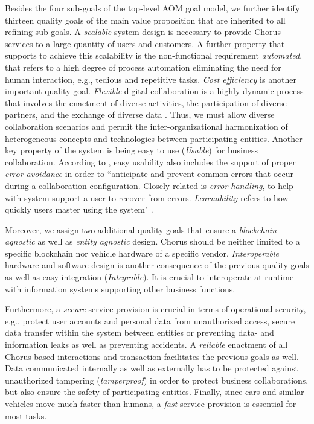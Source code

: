 \documentclass{llncs}
\begin{document}
{				Besides the four sub-goals of the top-level AOM goal model, we further identify thirteen quality goals of the main value proposition that are inherited to all refining sub-goals. A \textit{scalable} system design is necessary to provide Chorus services to a large quantity of users and customers. A further property that supports to achieve this scalability is the non-functional requirement \textit{automated}, that refers to a high degree of process automation eliminating the need for human interaction, e.g., tedious and repetitive tasks. \textit{Cost efficiency} is another important quality goal. \textit{Flexible} digital collaboration is a highly dynamic process that involves the enactment of diverse activities, the participation of diverse partners, and the exchange of diverse data \cite{norta2008exploring}. Thus, we must allow diverse collaboration scenarios and permit the inter-organizational harmonization of heterogeneous concepts and technologies between participating entities. Another key property of the system is being easy to use (\textit{Usable}) for business collaboration. According to \cite{norta2014reference}, easy usability also includes the support of proper \textit{error avoidance} in order to ``anticipate and prevent common errors that occur during a collaboration configuration. Closely related is \textit{error handling}, to help with system support a user to recover from errors. \textit{Learnability} refers to how quickly users master using the system" \cite{norta2014reference}. 
				
				Moreover, we assign two additional quality goals that ensure a \textit{blockchain agnostic} as well as \textit{entity agnostic} design. Chorus should be neither limited to a specific blockchain nor vehicle hardware of a specific vendor. \textit{Interoperable} hardware and software design is another consequence of the previous quality goals as well as easy integration (\textit{Integrable}). It is crucial to interoperate at runtime with information systems supporting other business functions.
				
				Furthermore, a \textit{secure} service provision is crucial in terms of operational security, e.g., protect user accounts and personal data from unauthorized access, secure data transfer within the system between entities or preventing data- and information leaks as well as preventing accidents. A \textit{reliable} enactment of all Chorus-based interactions and transaction facilitates the previous goals as well. Data communicated internally as well as externally has to be protected against unauthorized tampering (\textit{tamperproof}) in order to protect business collaborations, but also ensure the safety of participating entities. Finally, since cars and similar vehicles move much faster than humans, a \textit{fast} service provision is essential for most tasks.
			
}
\end{document}
